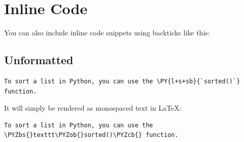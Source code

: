 \documentclass[a4paper,twoside]{article}
\begin{document}
\section{Inline Code}
You can also include inline code snippets using backticks  like this:
\subsection{Unformatted}
\begin{tscode}[lang=markdown, engine=pygments]
\begin{Verbatim}[commandchars=\\\{\},breaklines, breakanywhere, commandchars=\\\{\}]
To sort a list in Python, you can use the \PY{l+s+sb}{`sorted()`} function.
\end{Verbatim}
\end{tscode}
It will simply be rendered as monospaced text in \LaTeX{}:
\begin{tscode}[lang=text, engine=pygments]
\begin{Verbatim}[commandchars=\\\{\},breaklines, breakanywhere, commandchars=\\\{\}]
To sort a list in Python, you can use the \PYZbs{}texttt\PYZob{}sorted()\PYZcb{} function.
\end{Verbatim}
\end{tscode}
\end{document}
